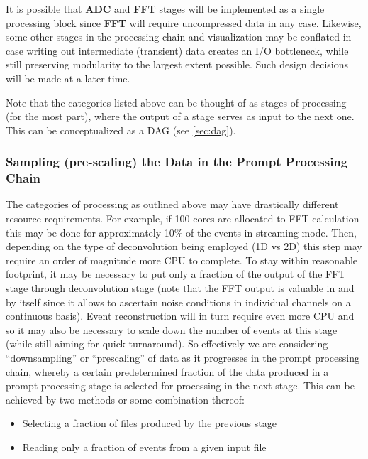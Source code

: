 \documentclass[pdftex,12pt,letter]{article}
\begin{document}
\noindent It is possible that \textbf{ADC} and \textbf{FFT} stages will be implemented as a single processing
block since \textbf{FFT} will require uncompressed data in any case. Likewise, some other stages in the processing
chain and visualization may be conflated in case writing out intermediate (transient) data creates an I/O bottleneck,
while still preserving modularity to the largest extent possible. Such design decisions will be made at a later time.

Note that the categories listed above can be thought of as stages of processing (for the most part), where
the output of a stage serves as input to the next one. This can be conceptualized as a DAG (see \ref{sec:dag}).

\subsubsection{Sampling (pre-scaling) the Data in the Prompt Processing Chain}
\label{sec:downsampling}
The categories of processing as outlined above may have drastically different resource requirements.
For example, if 100 cores are allocated to FFT calculation this may be done for approximately 10\% of the events
in streaming mode. Then, depending on the type of deconvolution being employed (1D vs 2D) this step
may require an order of magnitude more CPU to complete. To stay within reasonable footprint,
it may be necessary to put only a fraction of the output of the FFT stage through deconvolution stage
(note that the FFT output is valuable in and by itself since it allows to ascertain noise conditions in individual channels
on a continuous basis). Event reconstruction will in turn require even more CPU
and so it may also be necessary to scale down the number of
events at this stage (while still aiming for quick turnaround). So effectively we are considering ``downsampling''
or ``prescaling'' 
of data as it progresses in the prompt processing chain, whereby a certain predetermined fraction of the data
produced in a prompt processing stage is selected for processing in the next stage.
This can be achieved by two methods or some combination thereof:
\begin{itemize}
\item Selecting a fraction of files produced by the previous stage
\item Reading only a fraction of events from a given input file
\end{itemize}
\end{document}
